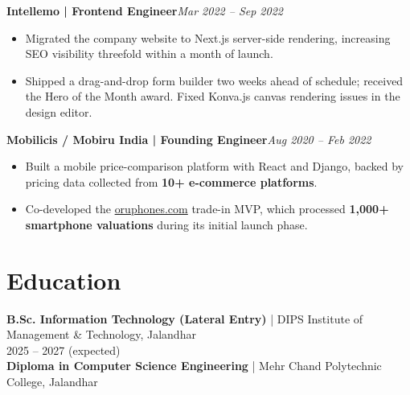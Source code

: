 \documentclass[a4paper,10pt]{article}
\newcommand{\job}[2]{\textbf{#1}\hfill\textit{#2}}
\begin{document}
\job{Intellemo | Frontend Engineer}{Mar 2022 -- Sep 2022}
\begin{itemize}
\item Migrated the company website to Next.js server-side rendering, increasing SEO visibility threefold within a month of launch.
\item Shipped a drag-and-drop form builder two weeks ahead of schedule; received the Hero of the Month award. Fixed Konva.js canvas rendering issues in the design editor.
\end{itemize}
\job{Mobilicis / Mobiru India | Founding Engineer}{Aug 2020 -- Feb 2022}
\begin{itemize}
\item Built a mobile price-comparison platform with React and Django, backed by pricing data collected from \textbf{10+ e-commerce platforms}.
\item Co-developed the \href{https://www.oruphones.com}{oruphones.com} trade-in MVP, which processed \textbf{1,000+ smartphone valuations} during its initial launch phase.
\end{itemize}
\section{Education}
\textbf{B.Sc. Information Technology (Lateral Entry)} | DIPS Institute of Management \& Technology, Jalandhar\\
2025 -- 2027 (expected)\\
\textbf{Diploma in Computer Science Engineering} | Mehr Chand Polytechnic College, Jalandhar
\end{document}
